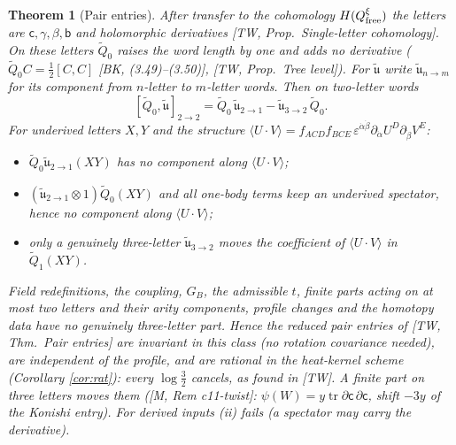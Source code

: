 \documentclass[10pt]{article}
\newtheorem{theorem}{Theorem}[section]
\theoremstyle{definition}
\begin{document}
\begin{theorem}[Pair entries]\label{thm:entries}
After transfer to the cohomology $H(Q^\xi_{\rm free})$ the letters are $\mathsf c,\gamma,\beta,\mathsf b$ and holomorphic derivatives [TW, Prop.~Single-letter cohomology]. On these letters $\tilde Q_0$ raises the word length by one and adds no derivative ($\tilde Q_0C=\tfrac12[C,C]$ [BK, (3.49)--(3.50)], [TW, Prop.~Tree level]). For $\tilde{\mathfrak u}$ write $\tilde{\mathfrak u}_{n\to m}$ for its component from $n$-letter to $m$-letter words. Then on two-letter words
\[
[\tilde Q_0,\tilde{\mathfrak u}]_{2\to2}=\tilde Q_0\,\tilde{\mathfrak u}_{2\to1}-\tilde{\mathfrak u}_{3\to2}\,\tilde Q_0 .
\]
For underived letters $X,Y$ and the structure $\langle U\cdot V\rangle=f_{ACD}f_{BCE}\,\varepsilon^{\dot\alpha\dot\beta}\partial_{\dot\alpha}U^D\partial_{\dot\beta}V^E$:
\begin{itemize}
\item[(i)] $\tilde Q_0\tilde{\mathfrak u}_{2\to1}(XY)$ has no component along $\langle U\cdot V\rangle$;
\item[(ii)] $(\tilde{\mathfrak u}_{2\to1}\otimes1)\tilde Q_0(XY)$ and all one-body terms keep an underived spectator, hence no component along $\langle U\cdot V\rangle$;
\item[(iii)] only a genuinely three-letter $\tilde{\mathfrak u}_{3\to2}$ moves the coefficient of $\langle U\cdot V\rangle$ in $\tilde Q_1(XY)$.
\end{itemize}
Field redefinitions, the coupling, $G_B$, the admissible $t$, finite parts acting on at most two letters and their arity components, profile changes and the homotopy data have no genuinely three-letter part. Hence the reduced pair entries of [TW, Thm.~Pair entries] are invariant in this class (no rotation covariance needed), are independent of the profile, and are rational in the heat-kernel scheme (Corollary \ref{cor:rat}): every $\log\tfrac32$ cancels, as found in [TW]. A finite part on three letters moves them ([M, Rem c11-twist]: $\psi(W)=y\operatorname{tr}\partial\mathsf c\,\partial\mathsf c$, shift $-3y$ of the Konishi entry). For derived inputs (ii) fails (a spectator may carry the derivative).
\end{theorem}
\end{document}
